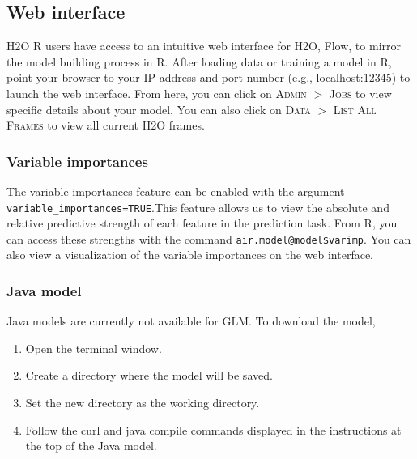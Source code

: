 \subsection{Web interface} \label{3.3}
H2O R users have access to an intuitive web interface for H2O, Flow, to mirror the model building process in R. After loading data or training a model in R, point your browser to your IP address and port number (e.g., localhost:12345) to launch the web interface. From here, you can click on \textsc{Admin} $>$ \textsc{Jobs} to view specific details about your model. You can also click on \textsc{Data} $>$ \textsc{List All Frames} to view all current H2O frames. 

\subsubsection{Variable importances} \label{3.3.1}
The variable importances feature can be enabled with the argument \texttt{variable\_importances=TRUE}.This feature allows us to view the absolute and relative predictive strength of each feature in the prediction task. From R, you can access these strengths with the command \texttt{air.model@model\$varimp}. You can also view a visualization of the variable
importances on the web interface.

\subsubsection{Java model} %
Java models are currently not available for GLM.
To download the model, 
\begin{enumerate}
\item Open the terminal window. 
\item Create a directory where the model will be saved.
\item Set the new directory as the working directory.
\item Follow the curl and java compile commands displayed in the instructions at the top of the Java model.
\end{enumerate}
\newpage





